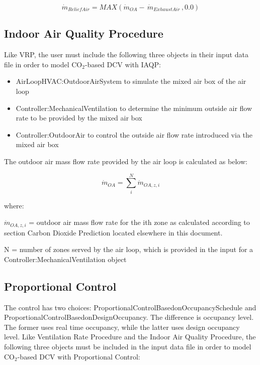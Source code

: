 \begin{equation}
{\dot m_{ReliefAir}} = MAX\left( {{{\dot m}_{OA}} - \,{{\dot m}_{ExhaustAir}}\,,0.0} \right)
\end{equation}

\subsection{Indoor Air Quality Procedure}\label{indoor-air-quality-procedure}

Like VRP, the user must include the following three objects in their input data file in order to model CO\(_{2}\)-based DCV with IAQP:

\begin{itemize}
  \item AirLoopHVAC:OutdoorAirSystem to simulate the mixed air box of the air loop
  \item Controller:MechanicalVentilation to determine the minimum outside air flow rate to be provided by the mixed air box
  \item Controller:OutdoorAir to control the outside air flow rate introduced via the mixed air box
\end{itemize}

The outdoor air mass flow rate provided by the air loop is calculated as below:

\begin{equation}
{\dot m_{OA}} = \sum\limits_i^N {{{\dot m}_{OA,z,i}}}
\end{equation}

where:

\({\dot m_{OA,z,i}}\) = outdoor air mass flow rate for the ith zone as calculated according to section Carbon Dioxide Prediction located elsewhere in this document.

N = number of zones served by the air loop, which is provided in the input for a Controller:MechanicalVentilation object

\subsection{Proportional Control}\label{proportional-control}

The control has two choices: ProportionalControlBasedonOccupancySchedule and ProportionalControlBasedonDesignOccupancy. The difference is occupancy level. The former uses real time occupancy, while the latter uses design occupancy level. Like Ventilation Rate Procedure and the Indoor Air Quality Procedure, the following three objects must be included in the input data file in order to model CO\(_{2}\)-based DCV with Proportional Control:

